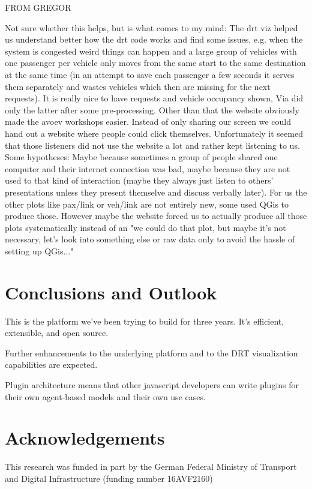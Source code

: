 \documentclass[3p,times,procedia]{elsarticle}
\begin{document}
FROM GREGOR

Not sure whether this helps, but is what comes to my mind: The drt viz helped us understand better how the drt code works and find some issues, e.g. when the system is congested weird things can happen and a large group of vehicles with one passenger per vehicle only moves from the same start to the same destination at the same time (in an attempt to save each passenger a few seconds it serves them separately and wastes vehicles which then are missing for the next requests). It is really nice to have requests and vehicle occupancy shown, Via did only the latter after some pre-processing. Other than that the website obviously made the avoev workshops easier. Instead of only sharing our screen we could hand out a website where people could click themselves. Unfortunately it seemed that those listeners did not use the website a lot and rather kept listening to us. Some hypotheses: Maybe because sometimes a group of people shared one computer and their internet connection was bad, maybe because they are not used to that kind of interaction (maybe they always just listen to others' presentations unless they present themselve and discuss verbally later). For us the other plots like pax/link or veh/link are not entirely new, some used QGis to produce those. However maybe the website forced us to actually produce all those plots systematically instead of an "we could do that plot, but maybe it's not necessary, let's look into something else or raw data only to avoid the hassle of setting up QGis..."

\section{Conclusions and Outlook}
\label{conclusions}

This is the platform we've been trying to build for three years. It's efficient, extensible, and open source.

Further enhancements to the underlying platform and to the DRT visualization capabilities are expected.

Plugin architecture means that other javascript developers can write plugins for their own agent-based models and their own use cases.

\section{Acknowledgements}
This research was funded in part by the German Federal Ministry of Transport and Digital Infrastructure (funding number 16AVF2160)
\end{document}
